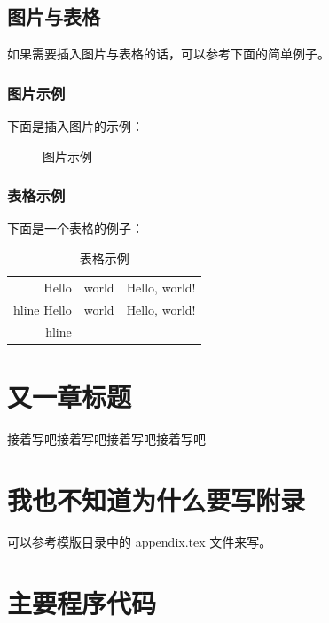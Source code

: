 \documentclass{swfcthesis}
\begin{document}
\section{图片与表格}

如果需要插入图片与表格的话，可以参考下面的简单例子。

\subsection{图片示例}

下面是插入图片的示例：

\begin{figure}[!ht]
  \centering
  \caption{图片示例}
  \label{fig:hello}
\end{figure}

\subsection{表格示例}

下面是一个表格的例子：

\begin{table}[!ht]
  \centering
  \begin{tabular}{|r|c|l|}    \hline
    Hello&world&Hello, world!\\hline
    Hello&world&Hello, world!\\hline
  \end{tabular}
  \caption{表格示例}
\end{table}

\chapter{又一章标题}

接着写吧接着写吧接着写吧接着写吧


\Appendix{}
\printbibliography[heading={bibintoc},title={参考文献}] %
\advisorinfopage{}                 %
\acknowledgmentspage{}             %


\chapter{我也不知道为什么要写附录} %

可以参考模版目录中的 appendix.tex 文件来写。

\chapter{主要程序代码} %


\begin{listing}[H]
\end{listing}  
\end{document}
